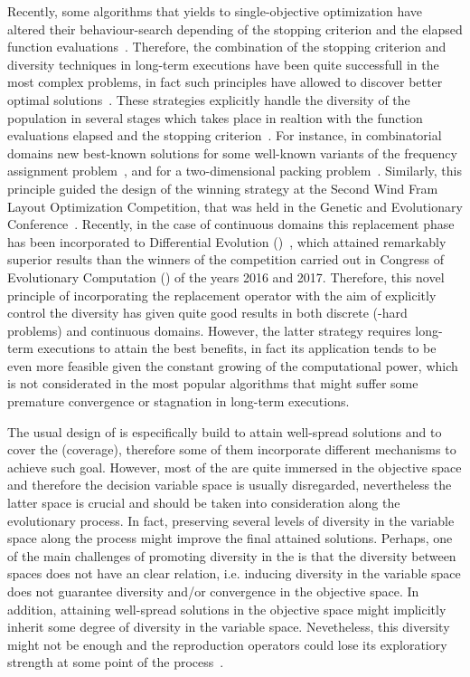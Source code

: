 Recently, some algorithms that yields to single-objective optimization have altered their behaviour-search depending of the stopping criterion and the elapsed function evaluations~\cite{castillo2019differential}.
%
Therefore, the combination of the stopping criterion and diversity techniques in long-term executions have been quite successfull in the most complex problems, in fact such principles have allowed to discover better optimal solutions~\cite{segura2016improving}.
%
These strategies explicitly handle the diversity of the population in several stages which takes place in realtion with the function evaluations elapsed and the stopping criterion~\cite{segura2015novel}.
%
For instance, in combinatorial domains new best-known solutions for some well-known variants of the frequency assignment problem~\cite{segura2016improving}, and for a two-dimensional packing problem~\cite{de2010optimisation}.
%
Similarly, this principle guided the design of the winning strategy at the Second Wind Fram Layout Optimization Competition, that was held in the Genetic and Evolutionary Conference~\cite{wilson2018evolutionary}.
%
Recently, in the case of continuous domains this replacement phase has been incorporated to Differential Evolution (\DE{})~\cite{castillo2019differential}, which attained remarkably superior results than the winners of the competition carried out in \IEEE{} Congress of Evolutionary Computation (\CEC{}) of the years 2016 and 2017.
%
Therefore, this novel principle of incorporating the replacement operator with the aim of explicitly control the diversity has given quite good results in both discrete (\NP{}-hard problems) and continuous domains.
%
However, the latter strategy requires long-term executions to attain the best benefits, in fact its application tends to be even more feasible given the constant growing of the computational power, which is not considerated in the most popular algorithms that might suffer some premature convergence or stagnation in long-term executions.
%

The usual design of \MOEAS{} is especifically build to attain well-spread solutions and to cover the \PF{} (coverage), therefore some of them incorporate different mechanisms to achieve such goal.
%
However, most of the \MOEAS{} are quite immersed in the objective space and therefore the decision variable space is usually disregarded, nevertheless the latter space is crucial and should be taken into consideration along the evolutionary process.
%
In fact, preserving several levels of diversity in the variable space along the process might improve the final attained solutions.
%
Perhaps, one of the main challenges of promoting diversity in the \MOPS{} is that the diversity between spaces does not have an clear relation, i.e. inducing diversity in the variable space does not guarantee diversity and/or convergence in the objective space.
%
In addition, attaining well-spread solutions in the objective space might implicitly inherit some degree of diversity in the variable space.
%
Nevetheless, this diversity might not be enough and the reproduction operators could lose its exploratiory strength at some point of the process~\cite{lu2002dynamic}.
%

